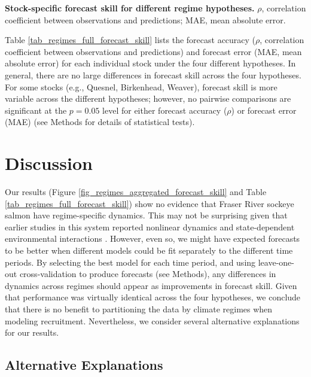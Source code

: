 \begin{table}[!ht]
\caption[Stock-specific forecast skill for different regime hypotheses.]{\textbf{Stock-specific forecast skill for different regime hypotheses.}\newline
$\rho$, correlation coefficient between observations and predictions; MAE, mean absolute error.}
\label{tab_regimes_full_forecast_skill}
\begin{center}
\resizebox{\textwidth}{!}{

}
\end{center}
\end{table}

Table \ref{tab_regimes_full_forecast_skill} lists the forecast accuracy ($\rho$,  correlation coefficient between observations and predictions) and forecast error (MAE, mean absolute error) for each individual stock under the four different hypotheses. In general, there are no large differences in forecast skill across the four hypotheses. For some stocks (e.g., Quesnel, Birkenhead, Weaver), forecast skill is more variable across the different hypotheses; however, no pairwise comparisons are significant at the $p = 0.05$ level for either forecast accuracy ($\rho$) or forecast error (MAE) (see Methods for details of statistical tests).

\section{Discussion}

Our results (Figure \ref{fig_regimes_aggregated_forecast_skill} and Table \ref{tab_regimes_full_forecast_skill}) show no evidence that Fraser River sockeye salmon have regime-specific dynamics. This may not be surprising given that earlier studies in this system reported nonlinear dynamics and state-dependent environmental interactions \cite{Ye_2015}. However, even so, we might have expected forecasts to be better when different models could be fit separately to the different time periods. By selecting the best model for each time period, and using leave-one-out cross-validation to produce forecasts (see Methods), any differences in dynamics across regimes should appear as improvements in forecast skill. Given that performance was virtually identical across the four hypotheses, we conclude that there is no benefit to partitioning the data by climate regimes when modeling recruitment. Nevertheless, we consider several alternative explanations for our results.

\subsection{Alternative Explanations}

